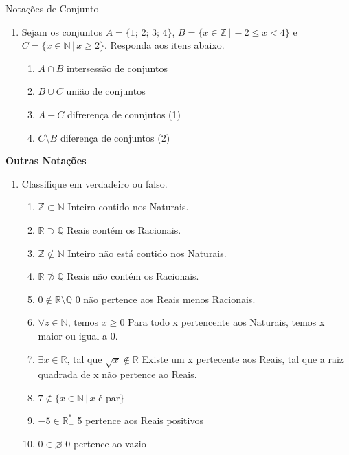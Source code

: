 \documentclass[a4paper, 12pt]{article}
\begin{document}
Notações de Conjunto
    \begin{enumerate}
        \item Sejam os conjuntos $A = \{1;\, 2;\, 3;\, 4\}$,
        $B = \{x \in \mathbb{Z} \, |\, -2 \leq x < 4\}$ e
        $C = \{x \in \mathbb{N} \, |\, x \geq 2\}$. Responda aos itens abaixo.
        \begin{enumerate}
            \item $A \cap B$ intersessão de conjuntos
            \item $B \cup C$ união de conjuntos
            \item $A - C$ difrerença de connjutos (1)
            \item $C \setminus B$ diferença de conjuntos (2)
        \end{enumerate}
    \end{enumerate}
\textbf{Outras Notações}
    \begin{enumerate}
        \item Classifique em verdadeiro ou falso.
        \begin{enumerate}
            \item $\mathbb{Z} \subset \mathbb{N}$ Inteiro contido nos Naturais.
            \item $\mathbb{R} \supset \mathbb{Q}$ Reais contém os Racionais.
            \item $\mathbb{Z} \not\subset \mathbb{N}$ Inteiro não está contido nos Naturais.
            \item $\mathbb{R} \not\supset \mathbb{Q}$ Reais não contém os Racionais.
            \item $0 \not\in \mathbb{R} \setminus\mathbb{Q}$ 0 não pertence aos Reais menos Racionais.
            \item $\forall z \in \mathbb{N}$, temos $x \geq 0$ Para todo x pertencente aos Naturais, temos x maior ou igual a 0.
            \item $\exists x \in \mathbb{R}$, tal que $\sqrt{x} \not\in\mathbb{R}$ Existe um x pertecente aos Reais, tal que a raiz quadrada de x não pertence ao Reais.
            \item $7 \not\in \{x\in \mathbb{N} \,|\, x \textrm{ é par}\}$
            \item $-5 \in \mathbb{R}^*_+$ 5 pertence aos Reais positivos
            \item $0 \in \varnothing$ 0 pertence ao vazio
        \end{enumerate}
    \end{enumerate}
\end{document}
